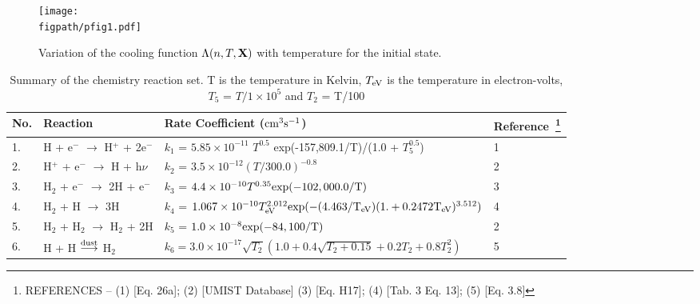 \documentclass[useAMS,usenatbib]{mn2e}
\newcommand{\figpath}{../NEWFIGS}
\begin{document}
\begin{figure}
\texttt{[image: \\figpath/pfig1.pdf]}
 \caption{Variation of the cooling
   function $\Lambda(n,T,{\bf{X}})$ with temperature for the initial
   state.}
\label{fig:tempvar}
\end{figure}

\begin{table*}
\begin{minipage}{\textwidth}
\caption{Summary of the chemistry reaction set. T is the temperature
  in Kelvin, $T_{\rm eV}$ is the temperature in electron-volts, $T_{5}$
  = $T/1\times10^{5}$  and 
$T_{2}$  = T/100}
\label{tab:chemeq}
\begin{tabular}{l l l l}
\hline
No. & Reaction & Rate Coefficient ($\rm {cm}^{3} s^{-1}$) &
Reference~\footnote{REFERENCES -- (1) \cite{Cen:1992p13616} [Eq. 26a];
  (2) \cite{Woodall:2007p13623} [UMIST Database] (3)
  \cite{Galli:1998p13066} [Eq. H17]; (4) \cite{Abel:1997p12836}
  [Tab. 3 Eq. 13]; (5) \cite{Hollenbach:1979p12707} [Eq. 3.8]}\\
\hline
1. & H + e$^{-}$ $\rightarrow$ H$^{+}$ + 2e$^{-}$ & $k_1$ = $5.85
\times 10^{-11}$ $T^{0.5}$ \rm{exp}(-157,809.1/T)/(1.0 + $T_{5}^{0.5}$) & 1\\
2. & H$^{+}$ + e$^{-}$ $\rightarrow$ H + h$\nu$ & $k_2$ =
$3.5\times10^{-12} (T/300.0)^{-0.8}$ & 2\\
3. & H$_{2}$ + e$^{-}$ $\rightarrow$ 2H + e$^{-}$ & $k_3$ =
$4.4\times10^{-10} T^{0.35} \rm{exp}(-102,000.0/T)$ & 3\\
4. & H$_{2}$ + H $\rightarrow$ 3H & $k_4$ = $1.067\times10^{-10}
T_{\rm eV}^{2.012}\rm{exp}(-(4.463/T_{\rm eV})(1. + 0.2472 T_{\rm eV})^{3.512}) $& 4\\
5. &H$_{2}$ + H$_{2}$ $\rightarrow$ H$_{2}$ + 2H & $k_5$ = $1.0\times 10^{-8} \rm{exp}(-84,100/T)$ & 2\\
6. & H + H $\overset{\rm dust}\longrightarrow$ H$_{2}$ & $k_6 =
3.0\times10^{-17}\sqrt{T_{2}}(1.0 + 0.4\sqrt{T_{2} + 0.15} + 0.2T_{2} + 0.8T_{2}^{2})$ & 5 \\
\hline
\end{tabular}
\end{minipage}
\end{table*}
\end{document}
